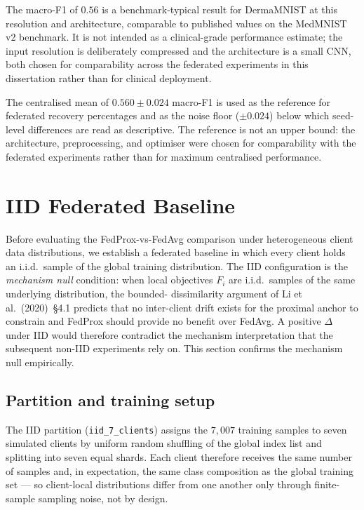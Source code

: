 \documentclass[11pt,a4paper]{report}
\begin{document}
The macro-F1 of $0.56$ is a benchmark-typical result for
DermaMNIST at this resolution and architecture, comparable to
published values on the MedMNIST v2 benchmark. It is not
intended as a clinical-grade performance estimate; the input
resolution is deliberately compressed and the architecture is a
small CNN, both chosen for comparability across the federated
experiments in this dissertation rather than for clinical
deployment.

The centralised mean of $0.560 \pm 0.024$ macro-F1 is used as the
reference for federated recovery percentages and as the noise floor
($\pm 0.024$) below which seed-level differences are read as
descriptive. The reference is not an upper bound: the architecture,
preprocessing, and optimiser were chosen for comparability with the
federated experiments rather than for maximum centralised
performance.

\section{IID Federated Baseline}
\label{sec:iid-baseline}

Before evaluating the FedProx-vs-FedAvg comparison under
heterogeneous client data distributions, we establish a federated
baseline in which every client holds an i.i.d.\ sample of the
global training distribution. The IID configuration is the
\emph{mechanism null} condition: when local objectives $F_i$ are
i.i.d.\ samples of the same underlying distribution, the bounded-
dissimilarity argument of Li et al.\ (2020)~\S4.1 predicts that
no inter-client drift exists for the proximal anchor to constrain
and FedProx should provide no benefit over FedAvg. A positive
$\Delta$ under IID would therefore contradict the mechanism
interpretation that the subsequent non-IID experiments rely on.
This section confirms the mechanism null empirically.

\subsection{Partition and training setup}
\label{sec:iid-setup}

The IID partition (\texttt{iid\_7\_clients}) assigns the
$7{,}007$ training samples to seven simulated clients by uniform
random shuffling of the global index list and splitting into
seven equal shards. Each client therefore receives the same
number of samples and, in expectation, the same class
composition as the global training set --- so client-local
distributions differ from one another only through finite-sample
sampling noise, not by design.
\end{document}
